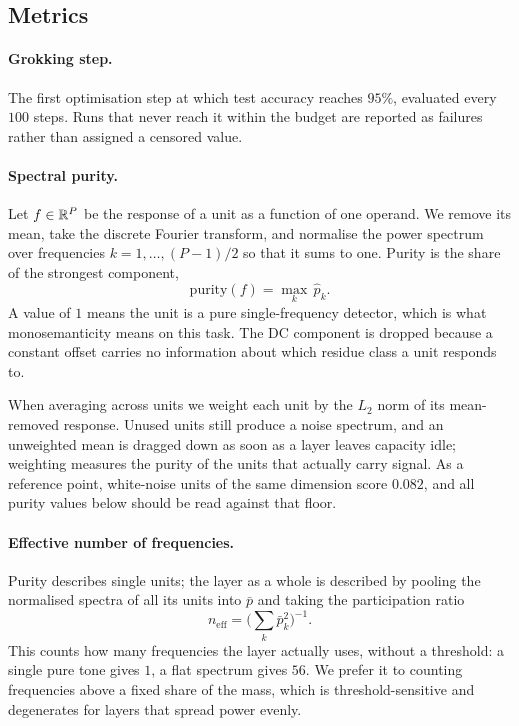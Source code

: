 \subsection{Metrics}

\paragraph{Grokking step.} The first optimisation step at which test accuracy
reaches $95\%$, evaluated every $100$ steps. Runs that never reach it within
the budget are reported as failures rather than assigned a censored value.

\paragraph{Spectral purity.} Let $f \in \mathbb{R}^{P}$ be the response of a unit as a
function of one operand. We remove its mean, take the discrete Fourier
transform, and normalise the power spectrum over frequencies $k = 1, \ldots,
(P-1)/2$ so that it sums to one. Purity is the share of the strongest
component,
\begin{equation}
  \mathrm{purity}(f) = \max_k \, \hat{p}_k .
\end{equation}
A value of $1$ means the unit is a pure single-frequency detector, which is
what monosemanticity means on this task. The DC component is dropped because a
constant offset carries no information about which residue class a unit
responds to.

When averaging across units we weight each unit by the $L_2$ norm of its
mean-removed response. Unused units still produce a noise spectrum, and an
unweighted mean is dragged down as soon as a layer leaves capacity idle;
weighting measures the purity of the units that actually carry signal. As a
reference point, white-noise units of the same dimension score $0.082$, and
all purity values below should be read against that floor.

\paragraph{Effective number of frequencies.} Purity describes single units;
the layer as a whole is described by pooling the normalised spectra of all its
units into $\bar{p}$ and taking the participation ratio
\begin{equation}
  n_{\mathrm{eff}} = \Big(\textstyle\sum_k \bar{p}_k^2\Big)^{-1}.
\end{equation}
This counts how many frequencies the layer actually uses, without a threshold:
a single pure tone gives $1$, a flat spectrum gives $56$. We prefer it to
counting frequencies above a fixed share of the mass, which is
threshold-sensitive and degenerates for layers that spread power evenly.


